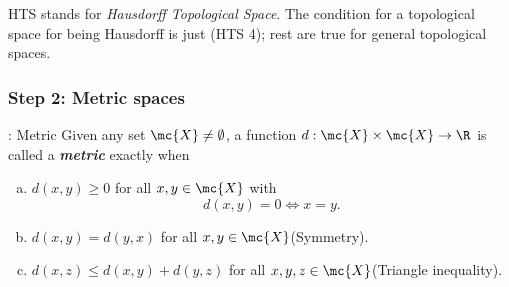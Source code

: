 \begin{comment}
	\draw[dotted, thick, fill = white!60!gray] (0, -0.875) circle (18pt);
	\draw[fill] (0, -0.875) circle (1pt);
	\node[below] at (0, -0.875) {\(y\)};
	\draw[<->] (0,-0.835) -- (0, -0.03);
	\node[right] at (0, -0.5) {\(r\)};
	\draw[fill] (-0.25, -0.6) circle (1pt);
	\node[right] at (-0.25, -0.6) {$x$};
	\draw[] (-2.5, -2.5) -- (-2.5, 2.5) -- (2.5, 2.5) -- (2.5, -2.5) -- (-2.5, -2.5);
	\node[right] at (2.5, -2.35) {\(\B[x;\eps)\)};
\end{comment}
\begin{note}
	HTS stands for \emph{Hausdorff Topological Space}. The condition for a topological space for being Hausdorff is just (HTS 4); rest are true for general topological spaces.
\end{note}

\subsubsection*{Step 2: Metric spaces}
\begin{ndef}{: Metric}
	Given any set \(\mc{X}\neq\emptyset\), a function \(d:\mc{X}\times\mc{X}\to\R\) is called a \emph{\textbf{
	metric}} exactly when 
	\begin{enumerate}[(a)]
		\item \(d(x,y)\geq 0\) for all \(x,y\in\mc{X}\) with
		\begin{equation*}
			d(x,y)=0\iff x=y.
		\end{equation*}
		
		\item \(d(x,y)=d(y,x)\) for all \(x,y\in\mc{X}\)\qquad (Symmetry).
		
		\item \(d(x,z)\leq d(x,y)+d(y,z)\) for all \(x,y,z\in\mc{X}\)\qquad (Triangle inequality).
	\end{enumerate}
\end{ndef}

